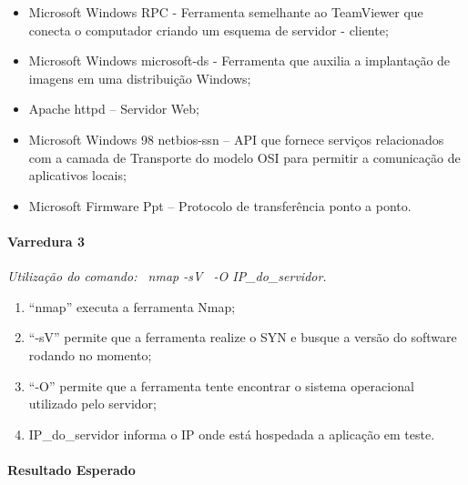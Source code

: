 \documentclass[
    12pt,               %
    openright,          %
    oneside,            %
    a4paper,            %
    section=TITLE,     %
    english,            %
    french,             %
    spanish,            %
    brazil              %
    ]{abntex2}
\begin{document}
\begin{itemize}
	
\item Microsoft Windows RPC - Ferramenta semelhante ao TeamViewer que conecta o computador criando um esquema de servidor - cliente;
	
\item Microsoft Windows microsoft-ds - Ferramenta que auxilia a implantação de imagens em uma distribuição Windows;
	
\item Apache httpd -- Servidor Web;
	
\item Microsoft Windows 98 netbios-ssn -- API que fornece serviços relacionados com a camada de Transporte do modelo OSI para permitir a comunicação de aplicativos locais;
	
\item Microsoft Firmware Ppt -- Protocolo de transferência ponto a ponto.

\end{itemize}


\paragraph*{Varredura 3}

\emph{Utilização do comando:~ nmap -sV~ -O IP\_do\_servidor.}



\begin{enumerate}[start=1]
	
\item ``nmap\textquotedblright{} executa a ferramenta Nmap;
	
\item \textquotedblleft{}-sV\textquotedblright{} permite que a ferramenta realize o SYN e busque a versão do software rodando no momento;
	
\item \textquotedblleft{}-O\textquotedblright{} permite que a ferramenta tente encontrar o sistema operacional utilizado pelo servidor;
	
\item IP\_do\_servidor informa o IP onde está hospedada a aplicação em teste.

\end{enumerate}


\paragraph*{Resultado Esperado}
\end{document}
